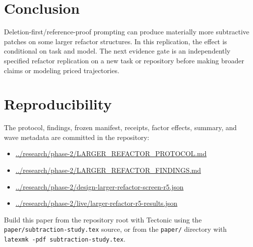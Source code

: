 \documentclass[11pt]{article}
\begin{document}
\section{Conclusion}
Deletion-first/reference-proof prompting can produce materially more
subtractive patches on some larger refactor structures. In this replication,
the effect is conditional on task and model. The next evidence gate is an
independently specified refactor replication on a new task or repository before
making broader claims or modeling priced trajectories.

\section*{Reproducibility}
The protocol, findings, frozen manifest, receipts, factor effects, summary,
and wave metadata are committed in the repository:
\begin{itemize}
\item \url{../research/phase-2/LARGER_REFACTOR_PROTOCOL.md}
\item \url{../research/phase-2/LARGER_REFACTOR_FINDINGS.md}
\item \url{../research/phase-2/design-larger-refactor-screen-r5.json}
\item \url{../research/phase-2/live/larger-refactor-r5-results.json}
\end{itemize}
Build this paper from the repository root with Tectonic using the
\texttt{paper/subtraction-study.tex} source, or from the \texttt{paper/}
directory with \texttt{latexmk -pdf subtraction-study.tex}.
\end{document}
